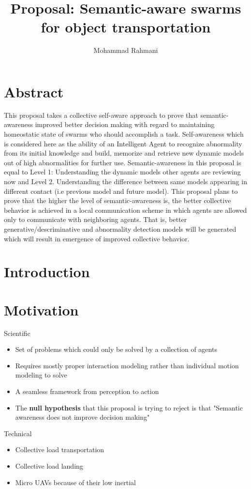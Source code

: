 \documentclass{article}
\begin{document}
	
	\title{Proposal: Semantic-aware swarms for object transportation}
	\author{Mohammad Rahmani}
	\date{}
	\maketitle
	\section{Abstract}
	This proposal takes a collective self-aware approach to prove that semantic-awareness improved better decision making with regard to maintaining homeostatic state of swarms who should accomplish a task. Self-awareness which is considered here as the ability of an Intelligent Agent to recognize abnormality from its initial knowledge and build, memorize and retrieve new dynamic models out of high abnormalities for further use. Semantic-awareness in this proposal is equal to  Level 1: Understanding the dynamic models other agents are reviewing now and Level 2. Understanding the difference between same models appearing in different contact (i.e previous model and future model). This proposal plans to prove that the higher the level of semantic-awareness is, the better collective behavior is achieved in a local communication scheme in which agents are allowed only to communicate with neighboring agents. That is, better generative/descriminative and abnormality detection models will be generated which will result in emergence of improved collective behavior.   
	\section{Introduction}
	
	
	\section{Motivation}
		Scientific
		\begin{itemize}
			\item Set of problems which could only be solved by a collection of agents
			\item Requires mostly proper interaction modeling rather than individual motion modeling to solve
			\item A seamless framework from perception to action
			\item The \textbf{null hypothesis} that this proposal is trying to reject is that "Semantic awareness does not improve decision making"
		\end{itemize}
		Technical
		\begin{itemize}
			\item Collective load transportation
			\item Collective load landing
			\item Micro UAVs because of their low inertial
		\end{itemize}
	
\end{document}
